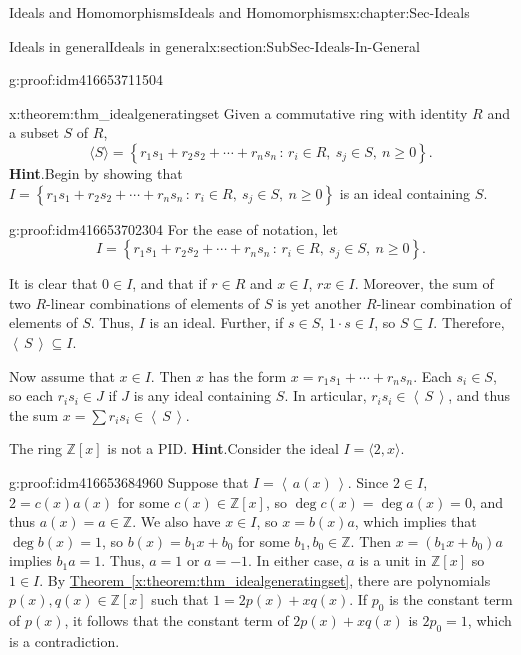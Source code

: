 \documentclass[oneside,10pt,]{book}
\numberwithin{equation}{section}
\renewcommand{\ge}{\geqslant}
\newcommand{\ideal}[1]{\left\langle\, #1 \,\right\rangle}
\newcommand{\setof}[2]{{\left\{#1\,\colon\,#2\right\}}}
\def\Z{{\mathbb Z}}
\begin{document}
\begin{chapterptx}{Ideals and Homomorphisms}{}{Ideals and Homomorphisms}{}{}{x:chapter:Sec-Ideals}
\begin{sectionptx}{Ideals in general}{}{Ideals in general}{}{}{x:section:SubSec-Ideals-In-General}
\begin{proofptx}{}{g:proof:idm416653711504}
\end{proofptx}
\begin{theorem}{}{}{x:theorem:thm_idealgeneratingset}%
Given a commutative ring with identity \(R\) and a subset \(S\) of \(R\),%
\begin{equation*}
\langle S \rangle = \setof{r_1 s_1 + r_2 s_2 + \cdots + r_n s_n}{r_i\in R, \ s_j \in S,\ n\ge 0}\text{.}
\end{equation*}
%
\textbf{Hint}.\quad{}Begin by showing that \(I=\setof{r_1 s_1 + r_2 s_2 + \cdots + r_n s_n}{r_i\in R, \ s_j \in S,\ n\ge 0}\) is an ideal containing \(S\).%
\end{theorem}
\begin{proofptx}{}{g:proof:idm416653702304}
For the ease of notation, let%
\begin{equation*}
I= \setof{r_1 s_1 + r_2 s_2 + \cdots + r_n s_n}{r_i\in R, \ s_j \in S,\ n\ge 0}\text{.}
\end{equation*}
%
\par
It is clear that \(0\in I\), and that if \(r\in R\) and \(x\in I\), \(rx\in I\). Moreover, the sum of two \(R\)-linear combinations of elements of \(S\) is yet another \(R\)-linear combination of elements of \(S\). Thus, \(I\) is an ideal. Further, if \(s\in S\), \(1\cdot s \in I\), so \(S\subseteq I\). Therefore, \(\ideal{S}\subseteq I\).%
\par
Now assume that \(x\in I\). Then \(x\) has the form \(x = r_1 s_1 + \cdots + r_n s_n\). Each \(s_i \in S\), so each \(r_i s_i \in J\) if \(J\) is any ideal containing \(S\). In articular, \(r_i s_i \in \ideal{S}\), and thus the sum \(x = \sum r_i s_i \in \ideal{S}\).%
\end{proofptx}
\label{g:notation:idm416653690592}%
The ring \(\Z[x]\) is not a PID.%
\textbf{Hint}.\quad{}Consider the ideal \(I = \langle 2, x \rangle\).%
\begin{proofptx}{}{g:proof:idm416653684960}
Suppose that \(I = \ideal{a(x)}\). Since \(2\in I\), \(2 = c(x) a(x)\) for some \(c(x)\in \Z[x]\), so \(\deg c(x) = \deg a(x) = 0\), and thus \(a(x) = a\in \Z\). We also have \(x\in I\), so \(x = b(x) a\), which implies that \(\deg b(x) = 1\), so \(b(x) = b_1 x + b_0\) for some \(b_1,b_0\in \Z\). Then \(x = (b_1 x + b_0)a\) implies \(b_1 a = 1\). Thus, \(a = 1\) or \(a = -1\). In either case, \(a\) is a unit in \(\Z[x]\) so \(1\in I\). By \hyperref[x:theorem:thm_idealgeneratingset]{Theorem~\ref{x:theorem:thm_idealgeneratingset}}, there are polynomials \(p(x),q(x)\in\Z[x]\) such that \(1 = 2p(x) + xq(x)\). If \(p_0\) is the constant term of \(p(x)\), it follows that the constant term of \(2p(x) + xq(x)\) is \(2p_0 = 1\), which is a contradiction.%

\end{proofptx}
\end{sectionptx}
\end{chapterptx}
\end{document}

